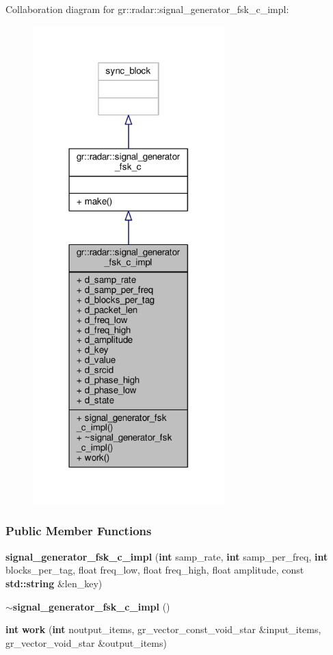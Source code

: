 Collaboration diagram for gr\+:\+:radar\+:\+:signal\+\_\+generator\+\_\+fsk\+\_\+c\+\_\+impl\+:
\nopagebreak
\begin{figure}[H]
\begin{center}
\leavevmode
\includegraphics[width=210pt]{dc/d3a/classgr_1_1radar_1_1signal__generator__fsk__c__impl__coll__graph}
\end{center}
\end{figure}
\subsubsection*{Public Member Functions}
\begin{DoxyCompactItemize}
\item 
{\bf signal\+\_\+generator\+\_\+fsk\+\_\+c\+\_\+impl} ({\bf int} samp\+\_\+rate, {\bf int} samp\+\_\+per\+\_\+freq, {\bf int} blocks\+\_\+per\+\_\+tag, float freq\+\_\+low, float freq\+\_\+high, float amplitude, const {\bf std\+::string} \&len\+\_\+key)
\item 
{\bf $\sim$signal\+\_\+generator\+\_\+fsk\+\_\+c\+\_\+impl} ()
\item 
{\bf int} {\bf work} ({\bf int} noutput\+\_\+items, gr\+\_\+vector\+\_\+const\+\_\+void\+\_\+star \&input\+\_\+items, gr\+\_\+vector\+\_\+void\+\_\+star \&output\+\_\+items)
\end{DoxyCompactItemize}
